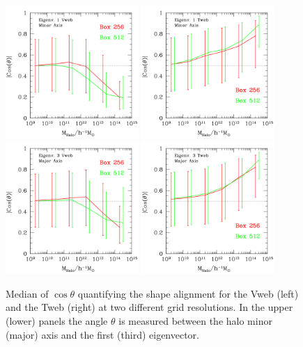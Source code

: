 \documentclass[usenatbib]{mn2e}
\begin{document}
\begin{figure}
\includegraphics[width=0.45\textwidth]{../plot2/Mass/VWeb.pdf}
\includegraphics[width=0.45\textwidth]{../plot2/Mass/TWeb.pdf}
\includegraphics[width=0.45\textwidth]{../plot2/Mass/VWebV2.pdf}
\includegraphics[width=0.45\textwidth]{../plot2/Mass/TWebV2.pdf}
\caption{Median of $\cos\theta$ quantifying the shape alignment for
  the Vweb (left) and the Tweb (right) at two different grid
  resolutions. In the upper (lower) panels the angle $\theta$ is
  measured between the halo minor (major) axis and the first (third)
  eigenvector.} 
\end{figure}
\end{document}
